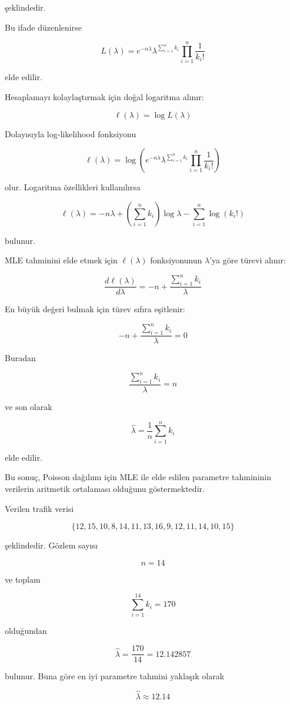 \documentclass[12pt,a4paper]{article}
\begin{document}
şeklindedir.

Bu ifade düzenlenirse

\[
L(\lambda)=e^{-n\lambda}\lambda^{\sum_{i=1}^{n}k_i}\prod_{i=1}^{n}\frac{1}{k_i!}
\]

elde edilir.

Hesaplamayı kolaylaştırmak için doğal logaritma alınır:

\[
\ell(\lambda)=\log L(\lambda)
\]

Dolayısıyla log-likelihood fonksiyonu

\[
\ell(\lambda)
=
\log\left(
e^{-n\lambda}\lambda^{\sum_{i=1}^{n}k_i}\prod_{i=1}^{n}\frac{1}{k_i!}
\right)
\]

olur. Logaritma özellikleri kullanılırsa

\[
\ell(\lambda)= -n\lambda + \left(\sum_{i=1}^{n}k_i\right)\log\lambda - \sum_{i=1}^{n}\log(k_i!)
\]

bulunur.

MLE tahminini elde etmek için \(\ell(\lambda)\) fonksiyonunun \(\lambda\)'ya göre türevi alınır:

\[
\frac{d\ell(\lambda)}{d\lambda}
=
-n+\frac{\sum_{i=1}^{n}k_i}{\lambda}
\]

En büyük değeri bulmak için türev sıfıra eşitlenir:

\[
-n+\frac{\sum_{i=1}^{n}k_i}{\lambda}=0
\]

Buradan

\[
\frac{\sum_{i=1}^{n}k_i}{\lambda}=n
\]

ve son olarak

\[
\hat{\lambda}=\frac{1}{n}\sum_{i=1}^{n}k_i
\]

elde edilir.

Bu sonuç, Poisson dağılımı için MLE ile elde edilen parametre tahmininin verilerin aritmetik ortalaması olduğunu göstermektedir.

Verilen trafik verisi

\[
\{12,15,10,8,14,11,13,16,9,12,11,14,10,15\}
\]

şeklindedir. Gözlem sayısı

\[
n=14
\]

ve toplam

\[
\sum_{i=1}^{14}k_i = 170
\]

olduğundan

\[
\hat{\lambda}=\frac{170}{14}=12.142857
\]

bulunur. Buna göre en iyi parametre tahmini yaklaşık olarak

\[
\boxed{\hat{\lambda}\approx 12.14}
\]
\end{document}
